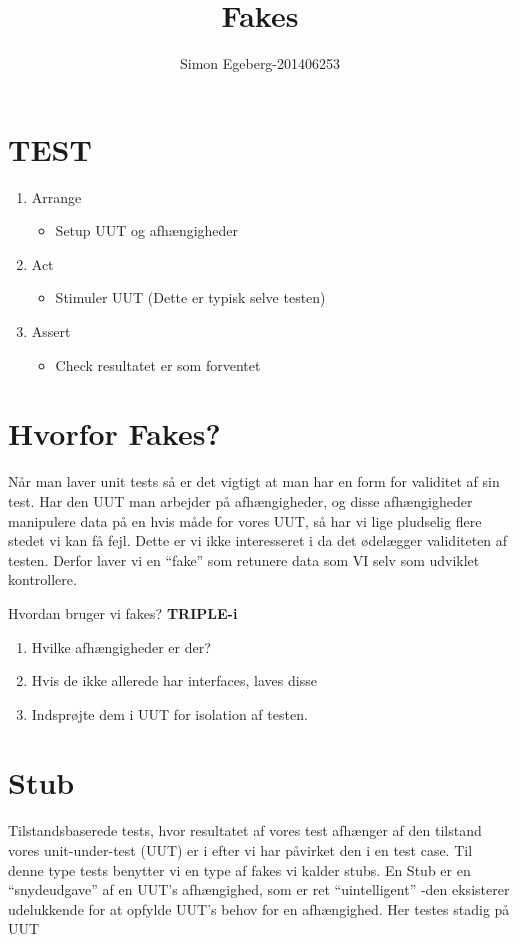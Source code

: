 \documentclass{article}
\title{Fakes}
\author{Simon Egeberg-201406253}
\begin{document}
\maketitle
\section{TEST}
\begin{enumerate}
	\item Arrange
	\begin{itemize}
		\item Setup UUT og afhængigheder
	\end{itemize}
	\item Act
	\begin{itemize}
		\item Stimuler UUT (Dette er typisk selve testen)
	\end{itemize}
	\item Assert
	\begin{itemize}
		\item Check resultatet er som forventet
	\end{itemize}
\end{enumerate}
\section{Hvorfor Fakes?}
Når man laver unit tests så er det vigtigt at man har en form for validitet af sin test. Har den UUT man arbejder på afhængigheder, og disse afhængigheder manipulere data på en hvis måde for vores UUT, så har vi lige pludselig flere stedet vi kan få fejl. Dette er vi ikke interesseret i da det ødelægger validiteten af testen. Derfor laver vi en ``fake'' som retunere data som VI selv som udviklet kontrollere. 

Hvordan bruger vi fakes? \textbf{TRIPLE-i} \\
\begin{enumerate}
	\item Hvilke afhængigheder er der?
	\item Hvis de ikke allerede har interfaces, laves disse
	\item Indsprøjte dem i UUT for isolation af testen.
\end{enumerate}

\section{Stub}
Tilstandsbaserede tests, hvor resultatet af vores test afhænger af den tilstand vores unit-under-test (UUT) er i efter vi har påvirket den i en test case. Til denne type tests benytter vi en type af fakes vi kalder stubs. En Stub er en ``snydeudgave'' af en UUT's afhængighed, som er ret ``uintelligent'' -den eksisterer udelukkende for at opfylde UUT's behov for en afhængighed. Her testes stadig på UUT
\end{document}
